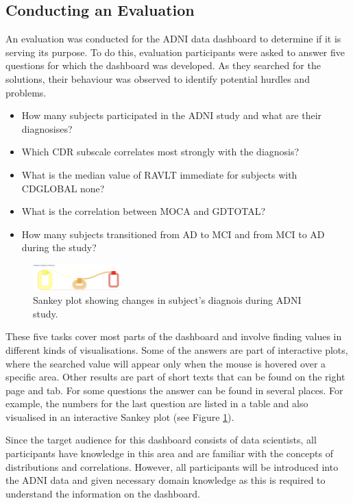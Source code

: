 \documentclass[11pt]{article}
\begin{document}
\subsection{Conducting an Evaluation}

An evaluation was conducted for the ADNI data dashboard to determine if it is serving its purpose. To do this, evaluation participants were asked to answer five questions for which the dashboard was developed. As they searched for the solutions, their behaviour was observed to identify potential hurdles and problems.

\begin{itemize}
    \item How many subjects participated in the ADNI study and what are their diagnosises?
    \item Which CDR subscale correlates most strongly with the diagnosis?
    \item What is the median value of RAVLT immediate for subjects with CDGLOBAL none?
    \item What is the correlation between MOCA and GDTOTAL?
    \item How many subjects transitioned from AD to MCI and from MCI to AD during the study?
\end{itemize}

\begin{figure}
    \includegraphics[width=0.3\textwidth]{./sankey.png}
    \caption{Sankey plot showing changes in subject's diagnois during ADNI study.}
    \label{sankey}
\end{figure}

These five tasks cover most parts of the dashboard and involve finding values in different kinds of visualisations. Some of the answers are part of interactive plots, where the searched value will appear only when the mouse is hovered over a specific area. Other results are part of short texts that can be found on the right page and tab. For some questions the answer can be found in several places. For example, the numbers for the last question are listed in a table and also visualised in an interactive Sankey plot (see Figure \ref{sankey}).

Since the target audience for this dashboard consists of data scientists, all participants have knowledge in this area and are familiar with the concepts of distributions and correlations. However, all participants will be introduced into the ADNI data and given necessary domain knowledge as this is required to understand the information on the dashboard.
\end{document}

